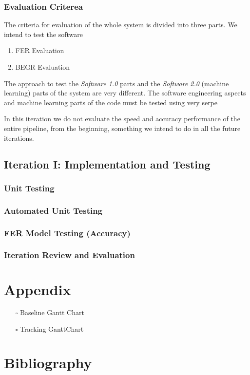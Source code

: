 \documentclass[12pt,a4paper,man]{report}
\begin{document}
\section{Evaluation Criterea}
\label{sec:org634517f}

The criteria for evaluation of the whole system is divided into three parts. We intend to test the software 
\begin{enumerate}
\item FER Evaluation
\item BEGR Evaluation
\end{enumerate}

The approach to test the \emph{Software 1.0} parts and the \emph{Software 2.0} (machine learning) parts of the system are very different.
The software engineering aspects and machine learning parts of the code must be tested using very serpe

In this iteration we do not evaluate the speed and accuracy performance of the entire pipeline, from the beginning, something we intend to do in all the future iterations.


\chapter{Iteration I: Implementation and Testing}
\label{sec:orgda41e97}

\section{Unit Testing}
\label{sec:orga5807fc}

\section{Automated Unit Testing}
\label{sec:org70622ea}

\section{FER Model Testing (Accuracy)}
\label{sec:org801f64d}

\section{Iteration Review and Evaluation}
\label{sec:org1dfee79}

\part{Appendix}
\label{sec:orgd30a6b4}
\begin{itemize}
\item[{$\square$}] Baseline Gantt Chart
\item[{$\square$}] Tracking GanttChart
\end{itemize}
\part{Bibliography}
\label{sec:org806a203}

\printglossaries



\end{document}
